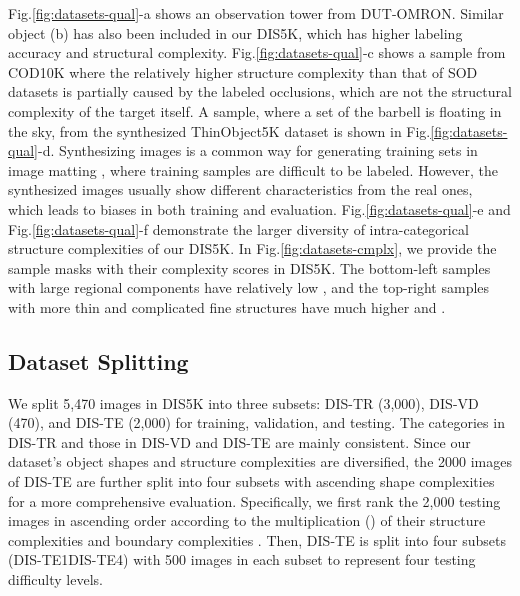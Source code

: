 \documentclass[10pt,twocolumn,letterpaper]{article}
\newcommand{\figref}[1]{Fig.\ref{#1}}
\begin{document}
\figref{fig:datasets-qual}-a shows an observation tower from DUT-OMRON. Similar object (b) has also been included in our DIS5K, which has higher labeling accuracy and structural complexity.  \figref{fig:datasets-qual}-c shows a sample from COD10K where the relatively higher structure complexity than that of SOD datasets is partially caused by the labeled occlusions, which are not the structural complexity of the target itself. A sample, where a set of the barbell is floating in the sky, from the synthesized ThinObject5K dataset is shown in \figref{fig:datasets-qual}-d. Synthesizing images is a common way for generating training sets in image matting \cite{xu2017deep,yu2020high}, where training samples are difficult to be labeled. However, the synthesized images usually show different characteristics from the real ones, which leads to biases in both training and evaluation. \figref{fig:datasets-qual}-e and \figref{fig:datasets-qual}-f demonstrate the larger diversity of intra-categorical structure complexities of our DIS5K. In \figref{fig:datasets-cmplx}, we provide the sample masks with their complexity scores in DIS5K. The bottom-left samples with large regional components have relatively low , and the top-right samples with more thin and complicated fine structures have much higher  and . 





















 





\subsection{Dataset Splitting}
We split 5,470 images in DIS5K into three subsets: DIS-TR (3,000), DIS-VD (470), and DIS-TE (2,000) for training, validation, and testing. The categories in DIS-TR and those in DIS-VD and DIS-TE are mainly consistent. Since our dataset's object shapes and structure complexities are diversified, the 2000 images of DIS-TE are further split into four subsets with ascending shape complexities for a more comprehensive evaluation. Specifically, we first rank the 2,000 testing images in ascending order according to the multiplication () of their structure complexities  and boundary complexities . Then, DIS-TE is split into four subsets (DIS-TE1DIS-TE4) with 500 images in each subset to represent four testing difficulty levels.
\end{document}
